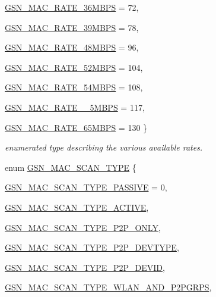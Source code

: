\begin{DoxyCompactItemize}
\par
\hyperlink{a00642_gga260da9755b2bec5e93c8b16a5a92d41da5a4fdc5677b4912f81aa0367a93ac63b}{GSN\_\-MAC\_\-RATE\_\-36MBPS} =  72, 
\par
\hyperlink{a00642_gga260da9755b2bec5e93c8b16a5a92d41da4ff541ec828e47779ab515bbce812432}{GSN\_\-MAC\_\-RATE\_\-39MBPS} =  78, 
\par
\hyperlink{a00642_gga260da9755b2bec5e93c8b16a5a92d41da90c278dcfd04b86e79b797239b3b133b}{GSN\_\-MAC\_\-RATE\_\-48MBPS} =  96, 
\par
\hyperlink{a00642_gga260da9755b2bec5e93c8b16a5a92d41dae36e5884dc5c75b3d0d06a9199213993}{GSN\_\-MAC\_\-RATE\_\-52MBPS} =  104, 
\par
\hyperlink{a00642_gga260da9755b2bec5e93c8b16a5a92d41daa73db96531738bd3cc757599330b490c}{GSN\_\-MAC\_\-RATE\_\-54MBPS} =  108, 
\par
\hyperlink{a00642_gga260da9755b2bec5e93c8b16a5a92d41da4fc0e557eb2aca6c25f56228efe4a365}{GSN\_\-MAC\_\-RATE\_\_\-5MBPS} =  117, 
\par
\hyperlink{a00642_gga260da9755b2bec5e93c8b16a5a92d41da3225e2fa7882610a3a764e0ccf7499a6}{GSN\_\-MAC\_\-RATE\_\-65MBPS} =  130
 \}
\begin{DoxyCompactList}\small\item\em enumerated type describing the various available rates. \end{DoxyCompactList}\item 
enum \hyperlink{a00642_gacd7033290927ecd0c0b3b6e9829ecb2e}{GSN\_\-MAC\_\-SCAN\_\-TYPE} \{ \par
\hyperlink{a00642_ggacd7033290927ecd0c0b3b6e9829ecb2ea365bc3b0d49cef29862eaefb8e74c58c}{GSN\_\-MAC\_\-SCAN\_\-TYPE\_\-PASSIVE} =  0, 
\par
\hyperlink{a00642_ggacd7033290927ecd0c0b3b6e9829ecb2ea8807821495b972487d959e08e67d1dd0}{GSN\_\-MAC\_\-SCAN\_\-TYPE\_\-ACTIVE}, 
\par
\hyperlink{a00642_ggacd7033290927ecd0c0b3b6e9829ecb2ea3b09e6f9740ed6f5510747c59b2e3af3}{GSN\_\-MAC\_\-SCAN\_\-TYPE\_\-P2P\_\-ONLY}, 
\par
\hyperlink{a00642_ggacd7033290927ecd0c0b3b6e9829ecb2ea148a646044a62921ae0f6f15a49d427d}{GSN\_\-MAC\_\-SCAN\_\-TYPE\_\-P2P\_\-DEVTYPE}, 
\par
\hyperlink{a00642_ggacd7033290927ecd0c0b3b6e9829ecb2ea42dc80aa1ea641af49db305afc3dd664}{GSN\_\-MAC\_\-SCAN\_\-TYPE\_\-P2P\_\-DEVID}, 
\par
\hyperlink{a00642_ggacd7033290927ecd0c0b3b6e9829ecb2ea922992fd8398f8d60e90a33674583b24}{GSN\_\-MAC\_\-SCAN\_\-TYPE\_\-WLAN\_\-AND\_\-P2PGRPS}, 

\end{DoxyCompactItemize}
